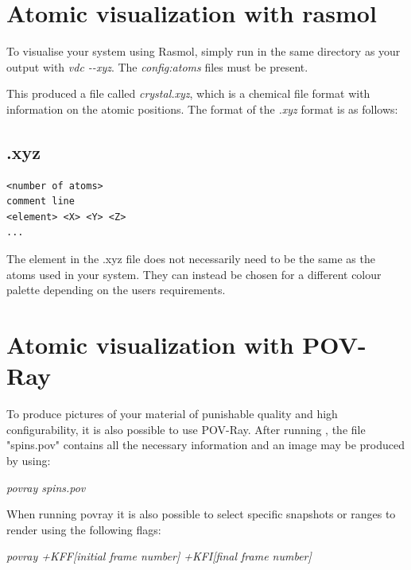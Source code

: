 \section*{Atomic visualization with rasmol}

To visualise your system using Rasmol, simply run \vdc in the same directory as
your output with \textit{vdc -{}-xyz}. The \textit{config:atoms} files must be
present.

This produced a file called \textit{crystal.xyz}, which is a chemical file
format with information on the atomic positions. The format of the \textit{.xyz}
format is as follows:

\subsection*{.xyz}
{\footnotesize
\begin{verbatim}
<number of atoms>
comment line
<element> <X> <Y> <Z>
...
\end{verbatim}
}

The element in the .xyz file does not necessarily need to be the same as the
atoms used in your system. They can instead be chosen for a different colour
palette depending on the users requirements.

\section*{Atomic visualization with POV-Ray}

To produce pictures of your material of punishable quality and high
configurability, it is also possible to use POV-Ray. After running \vdc, the
file "spins.pov" contains all the necessary information and an image may be
produced by using:

\noindent
\begin{minipage}[c]{\textwidth}
\centering
\textit{povray spins.pov}
\end{minipage}

When running povray it is also possible to select specific snapshots or ranges
to render using the following flags:

\noindent
\begin{minipage}[c]{\textwidth}
\centering
\textit{povray +KFF[initial frame number] +KFI[final frame number]}
\end{minipage}

